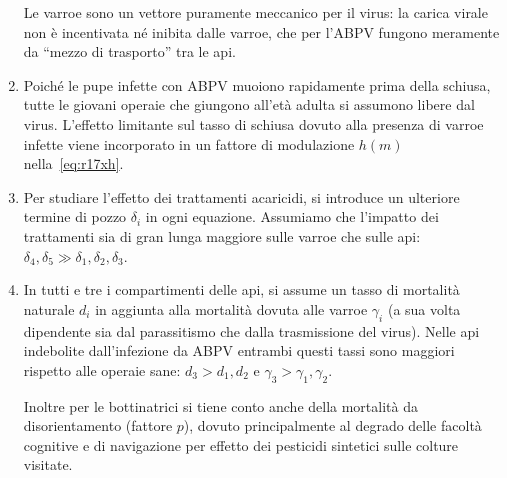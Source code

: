 \begin{enumerate}
    Le varroe sono un vettore puramente meccanico per il virus: la carica virale non è incentivata né
    inibita dalle varroe, che per l'ABPV fungono meramente da ``mezzo di trasporto'' tra le api.
    \item Poiché le pupe infette con ABPV muoiono rapidamente prima della schiusa, tutte le giovani operaie che
    giungono all'età adulta si assumono libere dal virus. L'effetto limitante sul tasso di schiusa dovuto alla
    presenza di varroe infette viene incorporato in un fattore di modulazione $h(m)$ nella~\eqref{eq:r17xh}.
    \item Per studiare l'effetto dei trattamenti acaricidi, si introduce un ulteriore termine di pozzo $\delta_i$ in ogni equazione. Assumiamo che l'impatto dei trattamenti sia di gran lunga maggiore sulle varroe che sulle api: $\delta_4, \delta_5 \gg \delta_1, \delta_2, \delta_3$.
    \item In tutti e tre i compartimenti delle api, si assume un tasso di mortalità naturale $d_i$ in aggiunta alla mortalità dovuta alle varroe $\gamma_i$ (a sua volta dipendente sia dal parassitismo che dalla trasmissione del virus). Nelle api indebolite dall'infezione da ABPV entrambi questi tassi sono maggiori rispetto alle operaie sane: $d_3 > d_1, d_2$ e $\gamma_3 > \gamma_1, \gamma_2$.

    Inoltre per le bottinatrici si tiene conto anche della mortalità da disorientamento (fattore $p$), dovuto
    principalmente al degrado delle facoltà cognitive e di navigazione per effetto dei pesticidi
    sintetici sulle colture visitate.
\end{enumerate}


